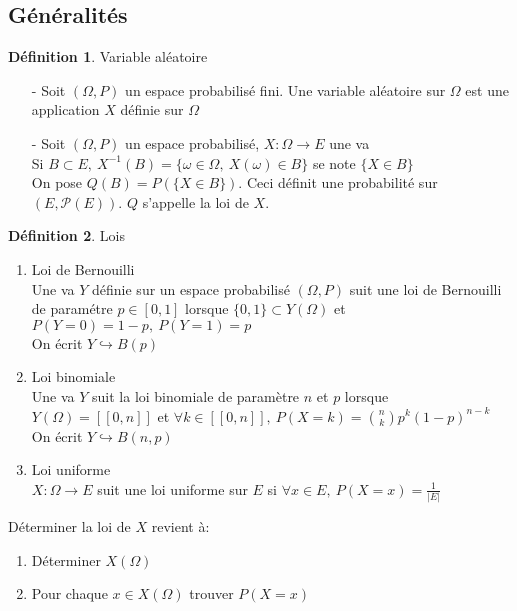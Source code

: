 \documentclass[fleqn]{article}
\theoremstyle{definition} \newtheorem*{defi}{D\'efinition}
\theoremstyle{definition} \newtheorem*{theo}{Th\'eor\`eme}
\theoremstyle{definition} \newtheorem*{coro}{Corollaire}
\theoremstyle{remark} \newtheorem*{rqs}{Remarques}
\theoremstyle{definition} \newtheorem*{prop}{Propri\'et\'e}
\begin{document}
\subsection{G\'en\'eralit\'es}
\begin{defi} Variable al\'eatoire
	\begin{itemize}
		\item [-] Soit $(\Omega, P)$ un espace probabilis\'e fini. Une variable al\'eatoire sur $\Omega$ est une application $X$ d\'efinie sur
			$\Omega$
		\item [-] Soit $(\Omega, P)$ un espace probabilis\'e, $X: \Omega \rightarrow E$ une va\\
			Si $B \subset E,\ X^{-1}(B) = \{\omega \in \Omega ,\ X(\omega) \in B\}$ se note $\{X \in B\}$\\
			On pose $Q(B) = P(\{X \in B\})$. Ceci d\'efinit une probabilit\'e sur $(E, \mathcal{P}(E))$. $Q$ s'appelle la loi de $X$.
	\end{itemize}
\end{defi}

\begin{defi} Lois
	\begin{enumerate}
		\item Loi de Bernouilli\\
			Une va $Y$ d\'efinie sur un espace probabilis\'e $(\Omega, P)$ suit une loi de Bernouilli de param\'etre $p \in [0,1]$ lorsque
			$\{0,1\} \subset Y(\Omega)$ et $P(Y = 0) = 1-p,\ P(Y = 1) = p$ \\
			On \'ecrit $Y \hookrightarrow B(p)$
		\item Loi binomiale \\
			Une va $Y$ suit la loi binomiale de param\`etre $n$ et $p$ lorsque $Y(\Omega) = [\![0,n]\!]$ et $\forall k \in [\![0,n]\!],\
			P(X=k) = \binom{n}{k} p^k (1-p)^{n-k}$\\
			On \'ecrit $Y \hookrightarrow B(n,p)$
		\item Loi uniforme \\
			$X: \Omega \rightarrow E$ suit une loi uniforme sur $E$ si $\forall x \in E,\ P(X = x) = \frac{1}{|E|}$
	\end{enumerate}
\end{defi}

D\'eterminer la loi de $X$ revient \`a:
\begin{enumerate}
	\item D\'eterminer $X(\Omega)$
	\item Pour chaque $x \in X(\Omega)$ trouver $P(X=x)$
\end{enumerate}
\end{document}
